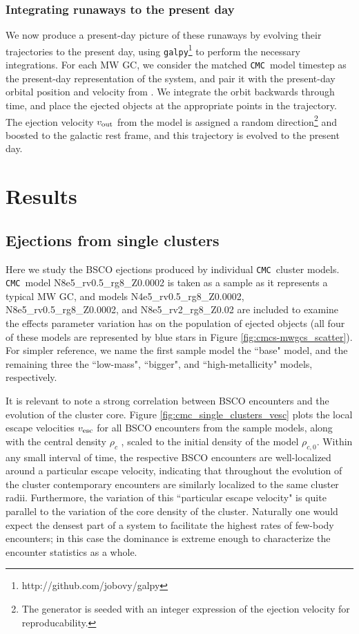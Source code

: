 \documentclass[twocolumn]{aastex631}
\newcommand{\CMC}{\texttt{CMC}}
\begin{document}
\subsubsection{Integrating runaways to the present day} \label{subsubsec:galpy}

We now produce a present-day picture of these runaways by evolving their trajectories to the present day, using \texttt{galpy}\footnote{http://github.com/jobovy/galpy} \citep{2015ApJS..216...29B} to perform the necessary integrations.
For each MW GC, we consider the matched \CMC\ model timestep as the present-day representation of the system, and pair it with the present-day orbital position and velocity from \citet{2018MNRAS.478.1520B}.
We integrate the orbit backwards through time, and place the ejected objects at the appropriate points in the trajectory.
The ejection velocity $v_{\rm out}$ from the model is assigned a random direction\footnote{The generator is seeded with an integer expression of the ejection velocity for reproducability.} and boosted to the galactic rest frame, and this trajectory is evolved to the present day.

\section{Results} \label{sec:results}

\subsection{Ejections from single clusters} \label{subsec:single_clusters}

Here we study the BSCO ejections produced by individual \CMC\ cluster models.
\CMC\ model N8e5\_rv0.5\_rg8\_Z0.0002 is taken as a sample as it represents a typical MW GC, and models N4e5\_rv0.5\_rg8\_Z0.0002, N8e5\_rv0.5\_rg8\_Z0.0002, and N8e5\_rv2\_rg8\_Z0.02 are included to examine the effects parameter variation has on the population of ejected objects (all four of these models are represented by blue stars in Figure \ref{fig:cmcs-mwgcs_scatter}).
For simpler reference, we name the first sample model the ``base" model, and the remaining three the ``low-mass", ``bigger", and ``high-metallicity" models, respectively.

It is relevant to note a strong correlation between BSCO encounters and the evolution of the cluster core.
Figure \ref{fig:cmc_single_clusters_vesc} plots the local escape velocities $v_{\rm esc}$ for all BSCO encounters from the sample models, along with the central density $\rho_c$ \citep{1985ApJ...298...80C}, scaled to the initial density of the model $\rho_{c,0}$.
Within any small interval of time, the respective BSCO encounters are well-localized around a particular escape velocity, indicating that throughout the evolution of the cluster contemporary encounters are similarly localized to the same cluster radii.
Furthermore, the variation of this ``particular escape velocity" is quite parallel to the variation of the core density of the cluster.
Naturally one would expect the densest part of a system to facilitate the highest rates of few-body encounters; in this case the dominance is extreme enough to characterize the encounter statistics as a whole.
\end{document}
